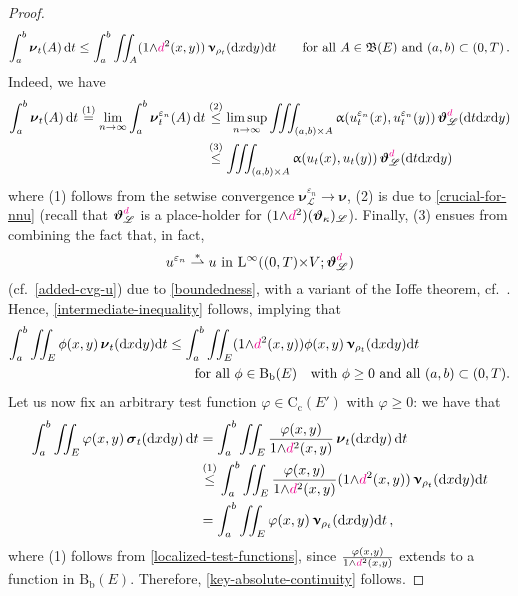 \documentclass[11pt,reqno]{amsart}
\numberwithin{equation}{section}
\newcommand{\scrL}{\mathscr{L}}
\newcommand{\eps}{\varepsilon}
\newcommand{\dd}{\mathrm{d}}
\theoremstyle{definition}
\newcommand{\ep}{\varepsilon}
\let\eps\ep
\def\dd{\mathrm{d}}
\newcommand{\Cc}{\mathrm{C}_{\mathrm{c}}}
\newcommand{\Bb}{\mathrm{B}_{\mathrm b}}
\newcommand{\weaksto}{\stackrel*\rightharpoonup}
\newcommand{\teta}{\boldsymbol \vartheta}
\newcommand{\tetapi}{\boldsymbol{\teta}_{\kappa}}
\newcommand{\Lebone}{\scrL}
\newcommand{\bnu}{\boldsymbol\upnu}
\newcommand{\Ed}{{E'}}
\newcommand{\ej}{\eps_n}
\newcommand{\ssigma}{\boldsymbol \sigma}
\newcommand{\nnu}{\boldsymbol \nu}
\newcommand{\rmL}{\mathrm{L}}
\newcommand{\RCR}{\color{magenta}}
\newcommand{\EEE}{\color{black}}
\newcommand{\dpi}{{\color{magenta} d}}
\numberwithin{equation}{section}
\begin{document}
\begin{proof}
 \begin{equation}
 \label{intermediate-inequality}
 \int_a^b  \nnu_t(A) \, \dd t \leq \int_a^b \iint_A  (1{\wedge} \dpi^2(x,y)) \, \bnu_{\rho_t} (\dd x \dd y) \dd t \qquad \text{for all } A \in \mathfrak{B}(E) \text{ and  }  (a,b) \subset (0,T)\,.
 \end{equation}
 Indeed, we  have 
 \[
 \begin{aligned}
  \int_a^b  \nnu_t(A) \, \dd t \stackrel{(1)}{=} \lim_{n\to\infty} \int_a^b \nnu_t^{\ej}(A) \, \dd t  
  &  \stackrel{(2)}{\leq} \limsup_{n\to\infty}\iiint_{(a,b){\times}A}
 \upalpha(u_t^{\ej}(x),u_t^{\ej}(y) ) \, \teta_\Lebone^{ \dpi}(\dd t \dd x \dd y) 
 \\
 &
  \stackrel{(3)}{\leq} \iiint_{(a,b){\times}A}
 \upalpha(u_t(x),u_t(y)) \, \teta_\Lebone^{ \dpi}(\dd t \dd x \dd y) 
\end{aligned}
 \]
 where {\footnotesize (1)}  follows from the setwise convergence $ \nnu_{\Lebone}^{\ej} \to    \nnu $,  {\footnotesize (2)} is due to  \eqref{crucial-for-nnu} (recall that 
  $\teta_\Lebone^{\dpi}$ is a place-holder for  $ (1{\wedge}\dpi^2)(\tetapi)_\Lebone$). %
  Finally, 
 {\footnotesize (3)}  ensues from combining  the fact that, in fact, 
 \[
 u^{\ej} \weaksto u \text{ in } \rmL^\infty((0,T){\times}V;  \teta_\Lebone^{ \dpi})
 \]
 (cf.\ \eqref{added-cvg-u}) due to  \eqref{boundedness}, with a variant of the Ioffe theorem, cf.\ \cite[Thm.\ 21, p.\ 171]{Valadier90}. Hence, \eqref{intermediate-inequality} 
 follows, implying that 
 \begin{equation}
 \label{localized-test-functions}
 \begin{aligned}
 \int_a^b \iint_{E} \phi(x,y) \, \nnu_t(\dd x \dd y) \dd t  & \leq  \int_a^b \iint_{E} (1{\wedge} \dpi^2(x,y)) \phi(x,y) \, \bnu_{\rho_t} (\dd x \dd y) \dd t 
 \\ & 
  \qquad \text{for all } \phi \in \Bb(E) \quad \text{with } \phi \geq 0 \text{ and all }  (a,b) \subset (0,T).
  \end{aligned}
  \end{equation}
 Let us now fix an arbitrary  test function $\varphi \in \Cc(\Ed)$ with $\varphi \geq 0$: we have that 
 \[
 \begin{aligned}
 \int_a^b \iint_{E} \varphi(x,y) \, \ssigma_t(\dd x \dd y)\,  \dd t  &  =  \int_a^b \iint_{E} \frac{\varphi(x,y)}{1{\wedge} \dpi^2(x,y)} \, \nnu_t(\dd x \dd y)\,  \dd t  
 \\
 & 
 \stackrel{(1)}{\leq} 
  \int_a^b \iint_{E} \frac{\varphi(x,y)}{1{\wedge} \dpi^2(x,y)} (1{\wedge} \dpi^2(x,y))  \, \bnu_{\rho_t} (\dd x \dd y)   \dd t  
  \\
  &
  = 
 \int_a^b \iint_{E} \varphi(x,y) \, \bnu_{\rho_t} (\dd x \dd y)   \dd t \,,
 \end{aligned}
\]
 where {\footnotesize (1)} follows from \eqref{localized-test-functions}, since $ \frac{\varphi(x,y)}{1{\wedge} \dpi^2(x,y)} $ extends to a function in $\Bb(E)$. Therefore, 
 \eqref{key-absolute-continuity} follows. 
 
   \end{proof} \EEE
\end{document}
